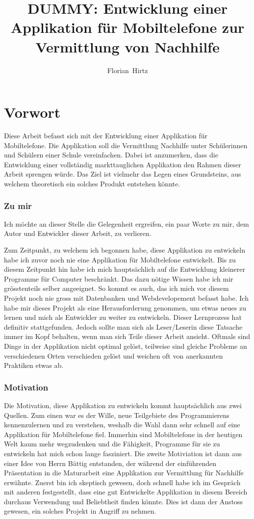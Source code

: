 \documentclass[a4paper,11pt]{report}
\author{Florian~Hirtz}
\title{DUMMY: Entwicklung einer Applikation für Mobiltelefone zur Vermittlung von Nachhilfe}
\begin{document}
	\maketitle	
	\section*{Vorwort}
	Diese Arbeit befasst sich mit der Entwicklung einer Applikation für Mobiltelefone. Die Applikation soll die Vermittlung Nachhilfe unter Schülerinnen und Schülern einer Schule vereinfachen. Dabei ist anzumerken, dass die Entwicklung einer vollständig markttauglichen Applikation den Rahmen dieser Arbeit sprengen würde. Das Ziel ist vielmehr das Legen eines Grundsteins, aus welchem theoretisch ein solches Produkt entstehen könnte.
	\subsubsection*{Zu mir}
	Ich möchte an dieser Stelle die Gelegenheit ergreifen, ein paar Worte zu mir, dem Autor und Entwickler dieser Arbeit, zu verlieren.
	
	Zum Zeitpunkt, zu welchem ich begonnen habe, diese Applikation zu entwickeln habe ich zuvor noch nie eine Applikation für Mobiltelefone entwickelt. Bis zu diesem Zeitpunkt hin habe ich mich hauptsächlich auf die Entwicklung kleinerer Programme für Computer beschränkt. Das dazu nötige Wissen habe ich mir grösstenteils selber angeeignet. So kommt es auch, das ich mich vor diesem Projekt noch nie gross mit Datenbanken und Webdevelopement befasst habe. Ich habe mir dieses Projekt als eine Herausforderung genommen, um etwas neues zu lernen und mich als Entwickler zu weiter zu entwickeln. Dieser Lernprozess hat definitiv stattgefunden. Jedoch sollte man sich als Leser/Leserin diese Tatsache immer im Kopf behalten, wenn man sich Teile dieser Arbeit ansieht. Oftmals sind Dinge in der Applikation nicht optimal gelöst, teilweise sind gleiche Probleme an verschiedenen Orten verschieden gelöst und weichen oft von anerkannten Praktiken etwas ab.
	\subsubsection*{Motivation}
	Die Motivation, diese Applikation zu entwickeln kommt hauptsächlich aus zwei Quellen. Zum einen war es der Wille, neue Teilgebiete des Programmierens kennenzulernen und zu verstehen, weshalb die Wahl dann sehr schnell auf eine Applikation für Mobiltelefone fiel. Immerhin sind Mobiltelefone in der heutigen Welt kaum mehr wegzudenken und die Fähigkeit, Programme für sie zu entwickeln hat mich schon lange fasziniert. Die zweite Motiviation ist dann aus einer Idee von Herrn Bättig entstanden, der während der einführenden Präsentation in die Maturarbeit eine Applikation zur Vermittlung für Nachhilfe erwähnte. Zuerst bin  ich skeptisch gewesen, doch schnell habe ich im Gespräch mit anderen festgestellt, dass eine gut Entwickelte Applikation in diesem Bereich durchaus Verwendung und Beliebtheit finden könnte. Dies ist dann der Anstoss gewesen, ein solches Projekt in Angriff zu nehmen. 
\end{document}
